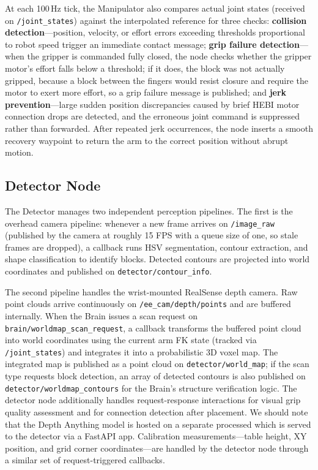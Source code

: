 \noindent At each 100\,Hz tick, the Manipulator also compares actual joint states (received on \texttt{/joint\_states}) against the interpolated reference for three checks: \textbf{collision detection}---position, velocity, or effort errors exceeding thresholds proportional to robot speed trigger an immediate contact message; \textbf{grip failure detection}---when the gripper is commanded fully closed, the node checks whether the gripper motor's effort falls below a threshold; if it does, the block was not actually gripped, because a block between the fingers would resist closure and require the motor to exert more effort, so a grip failure message is published; and \textbf{jerk prevention}---large sudden position discrepancies caused by brief HEBI motor connection drops are detected, and the erroneous joint command is suppressed rather than forwarded. After repeated jerk occurrences, the node inserts a smooth recovery waypoint to return the arm to the correct position without abrupt motion.

\subsection{Detector Node}

\noindent The Detector manages two independent perception pipelines. The first is the overhead camera pipeline: whenever a new frame arrives on \texttt{/image\_raw} (published by the camera at roughly 15 FPS with a queue size of one, so stale frames are dropped), a callback runs HSV segmentation, contour extraction, and shape classification to identify blocks. Detected contours are projected into world coordinates and published on \texttt{detector/contour\_info}.

\noindent The second pipeline handles the wrist-mounted RealSense depth camera. Raw point clouds arrive continuously on \texttt{/ee\_cam/depth/points} and are buffered internally. When the Brain issues a scan request on \texttt{brain/worldmap\_scan\_request}, a callback transforms the buffered point cloud into world coordinates using the current arm FK state (tracked via \texttt{/joint\_states}) and integrates it into a probabilistic 3D voxel map. The integrated map is published as a point cloud on \texttt{detector/world\_map}; if the scan type requests block detection, an array of detected contours is also published on \texttt{detector/worldmap\_contours} for the Brain's structure verification logic. The detector node additionally handles request-response interactions for visual grip quality assessment and for connection detection after placement. We should note that the Depth Anything model is hosted on a separate processed which is served to the detector via a FastAPI app. Calibration measurements---table height, XY position, and grid corner coordinates---are handled by the detector node through a similar set of request-triggered callbacks.

